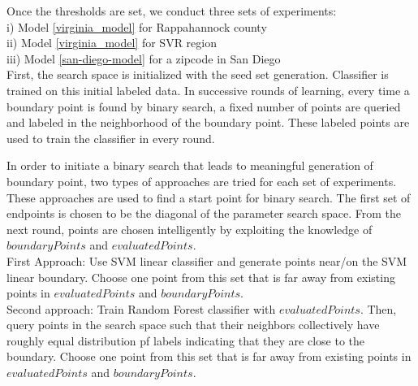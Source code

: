 Once the thresholds are set, we conduct three sets of experiments:\\
i) Model \ref{virginia_model} for Rappahannock county\\
ii) Model \ref{virginia_model} for SVR region\\
iii) Model \ref{san-diego-model} for a zipcode in San Diego\\
First, the search space is initialized with the seed set generation. Classifier is trained on this initial labeled data.
In successive rounds of learning, every time a boundary point is found by binary search, a fixed number of points are queried and labeled in the neighborhood of the boundary point. These labeled points are used to train the classifier in every round.

In order to initiate a binary search that leads to meaningful generation of boundary point, two types of approaches are tried for each set of experiments. These approaches are used to find a start point for binary search. The first set of endpoints is chosen to be the diagonal of the parameter search space. From the next round, points are chosen intelligently by exploiting the knowledge of $boundaryPoints$ and $evaluatedPoints$.\\
First Approach:
Use SVM linear classifier and generate points near/on the SVM linear boundary.
Choose one point from this set that is far away from existing points in $evaluatedPoints$ and $boundaryPoints$.\\
Second approach:
Train Random Forest classifier with $evaluatedPoints$. Then, query points in the search space such that their neighbors collectively have roughly equal distribution pf labels indicating that they are close to the boundary. Choose one point from this set that is far away from existing points in $evaluatedPoints$ and $boundaryPoints$.\\

